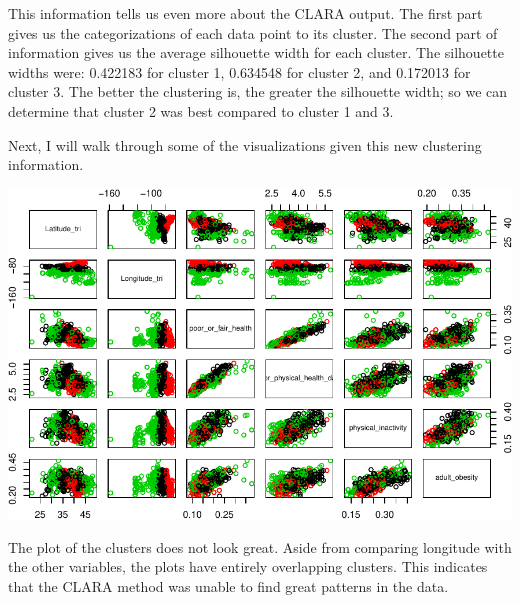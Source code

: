 \documentclass[12pt,twoside]{amherstthesis}
\begin{document}
  This information tells us even more about the CLARA output. The first
  part gives us the categorizations of each data point to its cluster. The
  second part of information gives us the average silhouette width for
  each cluster. The silhouette widths were: 0.422183 for cluster 1,
  0.634548 for cluster 2, and 0.172013 for cluster 3. The better the
  clustering is, the greater the silhouette width; so we can determine
  that cluster 2 was best compared to cluster 1 and 3.
  
  Next, I will walk through some of the visualizations given this new
  clustering information.
  
  \begin{Shaded}
  \begin{Highlighting}[]
  \OperatorTok{$}
  \OperatorTok{$} \OperatorTok{:}\NormalTok{, } \NormalTok{)}
  \end{Highlighting}
  \end{Shaded}
  
  \begin{center}\includegraphics{Comps_Proj_files/figure-latex/unnamed-chunk-9-1} \end{center}
  
  The plot of the clusters does not look great. Aside from comparing
  longitude with the other variables, the plots have entirely overlapping
  clusters. This indicates that the CLARA method was unable to find great
  patterns in the data.
  
\end{document}

